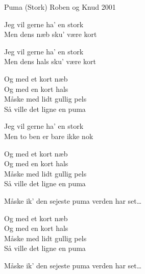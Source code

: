 \begin{song}{Puma (Stork)}{}
  {\SBOrgMel}
  {Roben og Knud}
  {2001}
  {\NotCCLIed}

  \begin{SBVerse}
    Jeg vil gerne ha' en stork\\
    Men dens næb sku' være kort\\
  \end{SBVerse}

  \begin{SBVerse}
    Jeg vil gerne ha' en stork\\
    Men dens hals sku' være kort\\
  \end{SBVerse}

  \begin{SBSection*}
    Og med et kort næb\\
    Og med en kort hals\\
    Måske med lidt gullig pels\\
    Så ville det ligne en puma
  \end{SBSection*}

  \begin{SBChorus}
  \end{SBChorus}

  \begin{SBVerse}
    Jeg vil gerne ha' en stork\\
    Men to ben er bare ikke nok\\
  \end{SBVerse}

  \begin{SBSection*}
    Og med et kort næb\\
    Og med en kort hals\\
    Måske med lidt gullig pels\\
    Så ville det ligne en puma
  \end{SBSection*}

  \begin{SBChorus}
    Måske ik' den sejeste puma verden har set\ldots
  \end{SBChorus}

  \begin{SBSection*}
    Og med et kort næb\\
    Og med en kort hals\\
    Måske med lidt gullig pels\\
    Så ville det ligne en puma
  \end{SBSection*}

  \begin{SBChorus}
    Måske ik' den sejeste puma verden har set\ldots
  \end{SBChorus}

  \begin{SBSection*}
  \end{SBSection*}

\end{song}